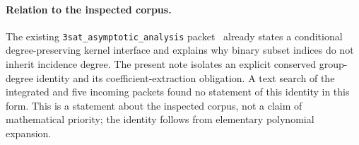 \paragraph{Relation to the inspected corpus.}
The existing \texttt{3sat\_asymptotic\_analysis} packet~\cite{degreeprior} already states a
conditional degree-preserving kernel interface and explains why binary
subset indices do not inherit incidence degree. The present note isolates
an explicit conserved group-degree identity and its coefficient-extraction
obligation. A text search of the integrated and five incoming packets
found no statement of this identity in this form. This is a statement
about the inspected corpus, not a claim of mathematical priority; the
identity follows from elementary polynomial expansion.
